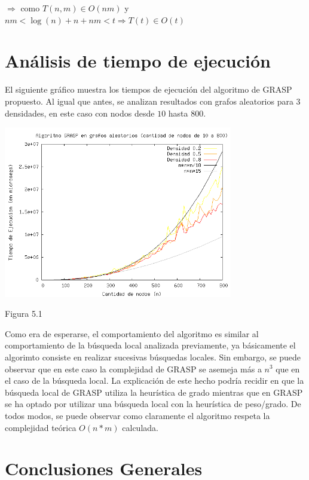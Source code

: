 \documentclass[a4paper,11pt] {article}
\begin{document}
\hspace{20pt} $\Longrightarrow$ como $T(n,m) \in O(nm)$ y $nm<\log(n)+n+nm<t \Longrightarrow T(t) \in O(t)$

\section*{Análisis de tiempo de ejecución}

El siguiente gráfico muestra los tiempos de ejecución del algoritmo de GRASP propuesto. Al igual que antes, se analizan resultados con grafos aleatorios para 3 densidades, en este caso con nodos desde $10$ hasta $800$.

\begin{center}
 \includegraphics[width=0.75\textwidth]{graficos/tiemposGrasp.png}
\begin{center}
Figura 5.1
\end{center}
\end{center}

Como era de esperarse, el comportamiento del algoritmo es similar al comportamiento de la búsqueda local analizada previamente, ya básicamente el algorimto consiste en realizar sucesivas búsquedas locales. Sin embargo, se puede observar que en este caso la complejidad de GRASP se asemeja más a $n^3$ que en el caso de la búsqueda local. La explicación de este hecho podría recidir en que la búsqueda local de GRASP utiliza la heurística de grado mientras que en GRASP se ha optado por utilizar una búsqueda local con la heurística de peso/grado. De todos modos, se puede observar como claramente el algoritmo respeta la complejidad teórica $O(n*m)$ calculada.

\section{Conclusiones Generales}
\end{document}
